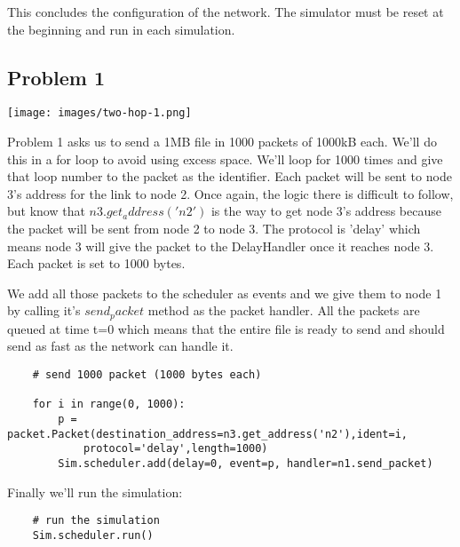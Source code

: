 \documentclass[11pt]{article}
\begin{document}
\vspace{5mm}

This concludes the configuration of the network. The simulator must be reset at the beginning and run in each simulation.

\subsection{Problem 1}

\vspace{5mm}

\texttt{[image: images/two-hop-1.png]}

\vspace{5mm}

Problem 1 asks us to send a 1MB file in 1000 packets of 1000kB each. We'll do this in a for loop to avoid using excess space. We'll loop for 1000 times and give that loop number to the packet as the identifier. Each packet will be sent to node 3's address for the link to node 2. Once again, the logic there is difficult to follow, but know that \(n3.get_address('n2')\) is the way to get node 3's address because the packet will be sent from node 2 to node 3. The protocol is 'delay' which means node 3 will give the packet to the DelayHandler once it reaches node 3. Each packet is set to 1000 bytes.

We add all those packets to the scheduler as events and we give them to node 1 by calling it's \(send_packet\) method as the packet handler. All the packets are queued at time t=0 which means that the entire file is ready to send and should send as fast as the network can handle it.

\vspace{5mm}

\begin{lstlisting}
    # send 1000 packet (1000 bytes each)

    for i in range(0, 1000):
        p = packet.Packet(destination_address=n3.get_address('n2'),ident=i,
            protocol='delay',length=1000)
        Sim.scheduler.add(delay=0, event=p, handler=n1.send_packet)
\end{lstlisting}

\vspace{5mm}

Finally we'll run the simulation:

\vspace{5mm}

\begin{lstlisting}
    # run the simulation
    Sim.scheduler.run()
\end{lstlisting}
\end{document}

